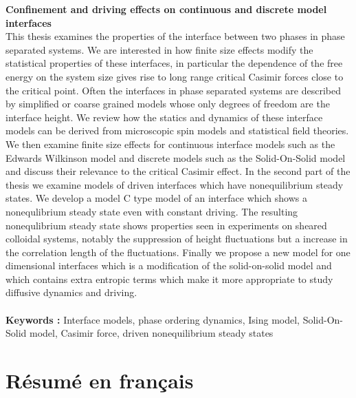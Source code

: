 {\bf Confinement and driving effects on continuous and discrete model interfaces}\\
This thesis examines the properties  of the interface between two phases in  phase separated systems. We are interested 
in how finite size effects modify the statistical properties of these interfaces, in particular  the dependence of the free energy on the system size 
gives rise to long range critical Casimir forces close to the critical point. Often the interfaces in phase separated systems are
described by simplified or coarse grained models whose only degrees of freedom are the interface height. We review how the statics and dynamics of
these  interface models can be derived from microscopic spin models and statistical field theories. We then examine finite size effects for 
continuous interface models such as the Edwards Wilkinson model and discrete models such as the Solid-On-Solid model  and discuss their 
relevance to the critical Casimir effect. In the second part of the thesis we examine models of driven interfaces which have nonequilibrium steady states. 
We develop a model C type model of an interface which shows a nonequlibrium steady
state even with constant driving. The resulting nonequlibrium steady state shows properties seen in experiments on sheared colloidal systems,
notably the suppression of height fluctuations but   a increase in the  correlation length of the fluctuations. Finally we propose a new model for
one dimensional interfaces which is a modification of  the solid-on-solid model and which contains extra entropic terms which make it more
appropriate to study diffusive dynamics and driving.
\\ \\
{\bf Keywords : }  Interface models, phase ordering dynamics, Ising model, Solid-On-Solid model, Casimir force, driven nonequilibrium steady states

\cleardoublepage
\chapter*{Résumé en français} 

